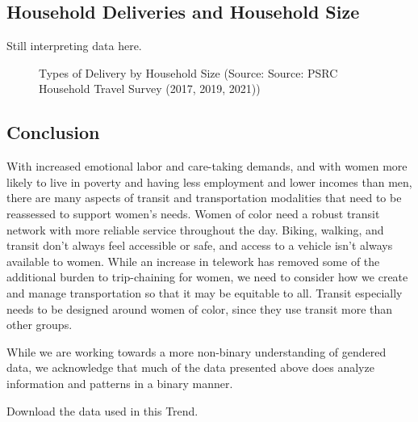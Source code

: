 \documentclass[
  11pt,
]{article}
\begin{document}
\hypertarget{household-deliveries-and-household-size}{%
\subsection{Household Deliveries and Household
Size}\label{household-deliveries-and-household-size}}

\begin{flushleft}
Still interpreting data here.
\end{flushleft}

\begin{figure}[H]
\newline{}\caption{Types of Delivery by Household Size (Source: Source: PSRC Household Travel Survey (2017, 2019, 2021))}\label{fig:hhsize}
\end{figure}

\hypertarget{conclusion}{%
\subsection{Conclusion}\label{conclusion}}

\begin{flushleft}
With increased emotional labor and care-taking demands, and with women more likely to live in poverty and having less employment and lower incomes than men, there are many aspects of transit and transportation modalities that need to be reassessed to support women's needs. Women of color need a robust transit network with more reliable service throughout the day. Biking, walking, and transit don't always feel accessible or safe, and access to a vehicle isn't always available to women. While an increase in telework has removed some of the additional burden to trip-chaining for women, we need to consider how we create and manage transportation so that it may be equitable to all. Transit especially needs to be designed around women of color, since they use transit more than other groups.

While we are working towards a more non-binary understanding of gendered data, we acknowledge that much of the data presented above does analyze information and patterns in a binary manner.

Download the data used in this Trend.
\end{flushleft}
\end{document}

